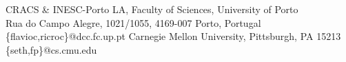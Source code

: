 {CRACS \& INESC-Porto LA, Faculty of Sciences, University of Porto\\
   Rua do Campo Alegre, 1021/1055, 4169-007 Porto, Portugal}
{\{flavioc,ricroc\}@dcc.fc.up.pt}
{Carnegie Mellon University, Pittsburgh, PA 15213}
{\{seth,fp\}@cs.cmu.edu}
\maketitle